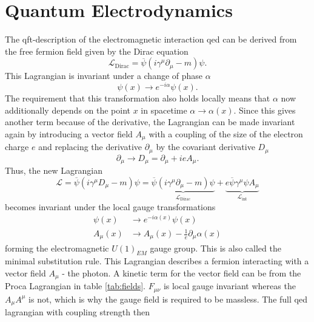 \section{Quantum Electrodynamics}\label{sec:qed}
The \ac{qft}-description of the electromagnetic interaction \ac{qed} can be derived from the free fermion field given by the Dirac equation
\begin{equation}
    \mathcal{L}_\mathrm{Dirac} = \overline{\psi}(i \gamma^\mu \partial_\mu - m )\psi.
    \label{eq:dirac}
\end{equation}
This Lagrangian is invariant under a change of phase $\alpha$
\begin{equation}
    \psi(x) \rightarrow  e^{-i \alpha}\psi(x).
\end{equation}
The requirement that this transformation also holds locally means that $\alpha$ now additionally depends on the point $x$ in spacetime $\alpha \rightarrow \alpha(x)$. Since this gives another term because of the derivative, the Lagrangian can be made invariant again by introducing a vector field $A_\mu$ with a coupling of the size of the electron charge $e$ and replacing the derivative $\partial_\mu$ by the covariant derivative $D_\mu$
\begin{equation}
    \partial_\mu \rightarrow D_\mu = \partial_\mu + ie A_\mu.
    \label{eq:cov_diff}
\end{equation}
Thus, the new Lagrangian
\begin{equation}
    \mathcal{L} = \overline{\psi}(i \gamma^\mu D_\mu - m )\psi
    =
    \underbrace{\overline{\psi}(i \gamma^\mu \partial_\mu - m )\psi}_{\mathcal{L}_\mathrm{Dirac} }
    +
    \underbrace{ e\overline{\psi} \gamma^\mu {\psi}A_\mu}_{\mathcal{L}_\mathrm{int}}
\end{equation}
becomes invariant under the local gauge transformations
\begin{align}
    \psi(x)  & \rightarrow  e^{-i \alpha(x)}\psi(x)                      \\
    A_\mu(x) & \xrightarrow{} A_\mu(x) -\frac{1}{e}\partial_\mu\alpha(x)
\end{align}
forming the electromagnetic $U(1)_{EM}$ gauge group. This is also called the minimal substitution rule. This Lagrangian describes a fermion interacting with a vector field $A_\mu$ - the photon. A kinetic term for the vector field can be from the Proca Lagrangian in table \ref{tab:fields}. $F_{\mu\nu}$ is local gauge invariant whereas the $A_\mu A^\mu$ is not, which is why the gauge field is required to be massless. The full \ac{qed} lagrangian with coupling strength  then

